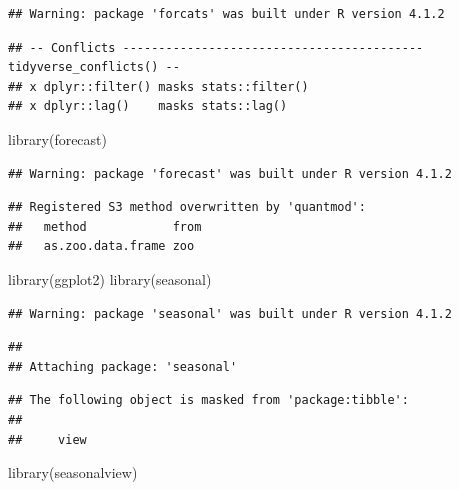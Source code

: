 \documentclass[
]{article}
\newenvironment{Shaded}{\begin{snugshade}}{\end{snugshade}}
\newcommand{\FunctionTok}[1]{\textcolor[rgb]{0.00,0.00,0.00}{#1}}
\newcommand{\NormalTok}[1]{#1}
\begin{document}
\begin{verbatim}
## Warning: package 'forcats' was built under R version 4.1.2
\end{verbatim}

\begin{verbatim}
## -- Conflicts ------------------------------------------ tidyverse_conflicts() --
## x dplyr::filter() masks stats::filter()
## x dplyr::lag()    masks stats::lag()
\end{verbatim}

\begin{Shaded}
\begin{Highlighting}[]
\FunctionTok{library}\NormalTok{(forecast)}
\end{Highlighting}
\end{Shaded}

\begin{verbatim}
## Warning: package 'forecast' was built under R version 4.1.2
\end{verbatim}

\begin{verbatim}
## Registered S3 method overwritten by 'quantmod':
##   method            from
##   as.zoo.data.frame zoo
\end{verbatim}

\begin{Shaded}
\begin{Highlighting}[]
\FunctionTok{library}\NormalTok{(ggplot2)}
\FunctionTok{library}\NormalTok{(seasonal)}
\end{Highlighting}
\end{Shaded}

\begin{verbatim}
## Warning: package 'seasonal' was built under R version 4.1.2
\end{verbatim}

\begin{verbatim}
## 
## Attaching package: 'seasonal'
\end{verbatim}

\begin{verbatim}
## The following object is masked from 'package:tibble':
## 
##     view
\end{verbatim}

\begin{Shaded}
\begin{Highlighting}[]
\FunctionTok{library}\NormalTok{(seasonalview)}
\end{Highlighting}
\end{Shaded}
\end{document}
